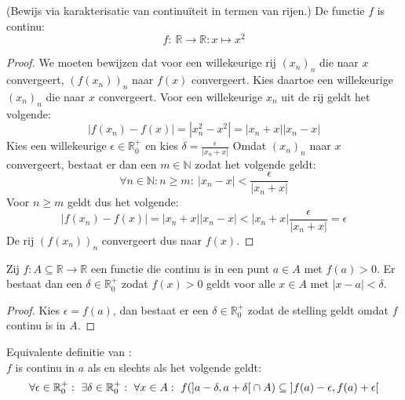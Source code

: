 \documentclass[main.tex]{subfiles}
\begin{document}
\begin{vb}
  (Bewijs via karakterisatie van continu\"iteit in termen van rijen.)
  De functie $f$ is continu:
  \[ f:\ \mathbb{R} \rightarrow \mathbb{R}: x \mapsto x^{2} \]
  
  \begin{proof}
    We moeten bewijzen dat voor een willekeurige rij $(x_{n})_{n}$ die naar $x$ convergeert, $(f(x_{n}))_{n}$ naar $f(x)$ convergeert.
    Kies daartoe een willekeurige $(x_{n})_{n}$ die naar $x$ convergeert.
    Voor een willekeurige $x_{n}$ uit de rij geldt het volgende:
    \[ |f(x_{n})-f(x)| = |x_{n}^{2}-x^{2}| = |x_{n}+x||x_{n}-x| \]
    Kies een willekeurige $\epsilon \in \mathbb{R}_{0}^{+}$ en kies $\delta = \frac{\epsilon}{|x_{n}+x|}$
    Omdat $(x_{n})_{n}$ naar $x$ convergeert, bestaat er dan een $m\in \mathbb{N}$ zodat het volgende geldt:
    \[ \forall n\in \mathbb{N}: n \ge m:\ |x_{n}-x| < \frac{\epsilon}{|x_{n}+x|} \]
    Voor $n \ge m$ geldt dus het volgende:
    \[ |f(x_{n})-f(x)| = |x_{n}+x||x_{n}-x| < |x_{n}+x|\frac{\epsilon}{|x_{n}+x|} = \epsilon \]
    De rij $(f(x_{n}))_{n}$ convergeert dus naar $f(x)$.
  \end{proof}
\end{vb}

\begin{vb}
  Zij $f: A \subseteq \mathbb{R} \rightarrow \mathbb{R}$ een functie die continu is in een punt $a\in A$ met $f(a) > 0$.
  Er bestaat dan een $\delta \in \mathbb{R}_{0}^{+}$ zodat $f(x)>0$ geldt voor alle $x\in A$ met $|x-a| < \delta$.

  \begin{proof}
    Kies $\epsilon = f(a)$, dan bestaat er een $\delta \in \mathbb{R}_{0}^{+}$ zodat de stelling geldt omdat $f$ continu is in $A$.
  \end{proof}
\end{vb}

\begin{st}
  Equivalente definitie van :\\
  $f$ is continu in $a$ als en slechts als het volgende geldt:
  \[ \forall \epsilon \in \mathbb{R}_{0}^{+}:\ \exists \delta \in \mathbb{R}_{0}^{+}:\ \forall x\in A:\ f(\interval[open]{a-\delta}{a+\delta} \cap A) \subseteq \interval[open]{f(a)-\epsilon}{f(a)+\epsilon} \]
\end{st}
\end{document}
